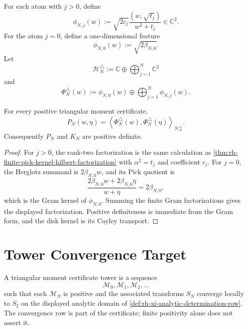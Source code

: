 \begin{definition}
\label{def:rh-triangular-hilbert-feature-map}
For each atom with $j>0$, define
$$
\phi_{N,j}(w)
:=
\sqrt{2c_j}
\frac{(w,\sqrt{t_j})}{w^2+t_j}
\in\mathbb C^2.
$$
For the atom $j=0$, define a one-dimensional feature
$$
\phi_{N,0}(w):=\sqrt{2\beta_{N,0}}.
$$
Let
$$
\mathcal H_N^{\triangle}
:=
\mathbb C
\oplus
\bigoplus_{j=1}^{N}\mathbb C^2
$$
and
$$
\Phi_N^{\triangle}(w)
:=
\phi_{N,0}(w)\oplus
\bigoplus_{j=1}^{N}\phi_{N,j}(w).
$$
\end{definition}

\begin{theorem}
\label{thm:rh-triangular-pick-kernel-finite-hilbert-factorization}
For every positive triangular moment certificate,
$$
P_N(w,\eta)
=
\left\langle
\Phi_N^{\triangle}(w),
\Phi_N^{\triangle}(\eta)
\right\rangle_{\mathcal H_N^{\triangle}}.
$$
Consequently $P_N$ and $K_N$ are positive definite.
\end{theorem}

\begin{proof}
For $j>0$, the rank-two factorization is the same calculation as
\autoref{thm:rh-finite-pick-kernel-hilbert-factorization} with
$\alpha^2=t_j$ and coefficient $c_j$. For $j=0$, the Herglotz summand is
$2\beta_{N,0}w$, and its Pick quotient is
$$
\frac{2\beta_{N,0}w+2\beta_{N,0}\overline{\eta}}
{w+\overline{\eta}}
=
2\beta_{N,0},
$$
which is the Gram kernel of $\phi_{N,0}$. Summing the finite Gram
factorizations gives the displayed factorization. Positive definiteness
is immediate from the Gram form, and the disk kernel is its Cayley
transport.
\end{proof}

\section{Tower Convergence Target}
\label{sec:rh-xi-triangular-tower-convergence}

\begin{definition}
\label{def:rh-triangular-moment-certificate-tower}
A triangular moment certificate tower is a sequence
$$
\mathcal M_0,\mathcal M_1,\mathcal M_2,\ldots
$$
such that each $\mathcal M_N$ is positive and the associated transforms
$S_N$ converge locally to $S_{\xi}$ on the displayed analytic domain of
\autoref{def:rh-xi-analytic-determination-row}. The convergence row is
part of the certificate; finite positivity alone does not assert it.
\end{definition}

